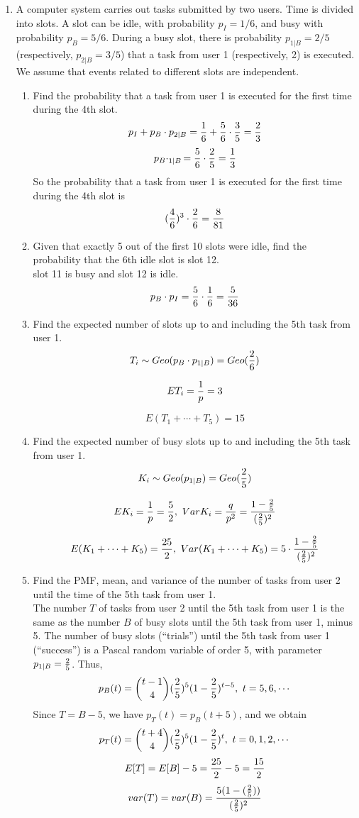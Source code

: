 \documentclass[12pt]{article}%
\newcommand{\0}{{\bf 0}}
\begin{document}
\begin{enumerate}
\item 
A computer system carries out tasks submitted by two users. Time is divided into slots. A slot can be idle, with probability $p_I = 1/6$, and busy with probability $p_B = 5/6$. During a busy slot, there is probability $p_{1|B} = 2/5$ (respectively, $p_{2|B} = 3/5$) that a task from user 1 (respectively, 2) is executed. We assume that events related to different slots are independent.
\begin{enumerate}
\item Find the probability that a task from user 1 is executed for the first time during the 4th slot.
\\
{\color{blue}{\bf Sol.}}
$$p_I+p_B\cdot p_{2|B}=\frac{1}{6}+\frac{5}{6}\cdot\frac{3}{5}=\frac{2}{3}$$
$$p_B\cdotp_{1|B}=\frac{5}{6}\cdot\frac{2}{5}=\frac{1}{3}$$
So the probability that a task from user 1 is executed for the first time during the 4th slot is 
$$(\frac{4}{6})^3\cdot\frac{2}{6}=\frac{8}{81}$$

\item Given that exactly 5 out of the first 10 slots were idle, find the probability that the 6th idle slot is slot 12.
\\
{\color{blue}{\bf Sol.}}
slot 11 is busy and slot 12 is idle.
$$p_B\cdot p_I=\frac{5}{6}\cdot\frac{1}{6}=\frac{5}{36}$$
\item Find the expected number of slots up to and including the 5th task from user 1.
\\
{\color{blue}{\bf Sol.}}
$$T_i \sim Geo(p_B\cdot p_{1|B})=Geo(\frac{2}{6})$$

$$ET_i=\frac{1}{p}=3$$

$$E(T_1+\cdots+T_5)=15$$

\item Find the expected number of busy slots up to and including the 5th task from user 1.
\\
{\color{blue}{\bf Sol.}}
$$K_i \sim Geo(p_{1|B})=Geo(\frac{2}{5})$$

$$EK_i=\frac{1}{p}=\frac{5}{2},~ VarK_i=\frac{q}{p^2}=\frac{1-\frac{2}{5}}{(\frac{2}{5})^2}$$

$$E(K_1+\cdots+K_5)=\frac{25}{2},~Var(K_1+\cdots+K_5)=5\cdot \frac{1-\frac{2}{5}}{(\frac{2}{5})^2}$$

\item Find the PMF, mean, and variance of the number of tasks from user 2 until the time of the 5th task from user 1.
\\
{\color{blue}{\bf Sol.}}
The number $T$ of tasks from user 2 until the 5th task from user 1 is the same as the
number $B$ of busy slots until the 5th task from user 1, minus 5. The number of busy
slots (“trials”) until the 5th task from user 1 (“success”) is a Pascal random variable
of order 5, with parameter $p_{1|B} = \frac{2}{5}$. Thus,
$$p_B(t)={t-1 \choose 4}(\frac{2}{5})^5(1-\frac{2}{5})^{t-5},~ t=5,6, \cdots$$  
Since $T = B - 5$, we have $p_T (t) = p_B(t + 5)$, and we obtain
$$p_T(t)={t+4 \choose 4}(\frac{2}{5})^5(1-\frac{2}{5})^t,~t=0,1,2, \cdots $$
$$E[T] = E[B] - 5 =\frac{25}{2}-5=\frac{15}{2}$$
$$var(T) = var(B)=\frac{5(1-(\frac{2}{5}))}{(\frac{2}{5})^2}$$


\end{enumerate}



\end{enumerate}
\end{document}
